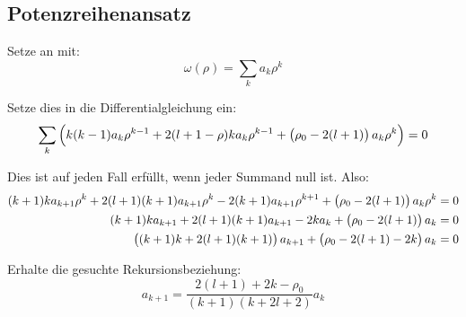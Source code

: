\subsection{Potenzreihenansatz}

Setze an mit:
\[
	\omega(\rho) = \sum_k a_k \rho^k
\]

Setze dies in die Differentialgleichung ein:
\[
	\sum_k \del{k(k-1) a_k \rho^{k-1} + 2(l+1-\rho) k a_k \rho^{k-1} + \del{\rho_0 - 2(l+1)} a_k \rho^k} = 0
\]

Dies ist auf jeden Fall erfüllt, wenn jeder Summand null ist. Also:
\begin{align*}
	(k+1) k a_{k+1} \rho^k + 2(l+1)(k+1) a_{k+1} \rho^k
	- 2(k+1) a_{k+1} \rho^{k+1} + \del{\rho_0 - 2(l+1)} a_k \rho^k &= 0 \\
	(k+1) k a_{k+1} + 2(l+1)(k+1) a_{k+1} - 2k a_k
	+ \del{\rho_0 - 2(l+1)} a_k &= 0 \\
	\del{(k+1) k + 2(l+1)(k+1) } a_{k+1}
	+ \del{\rho_0 - 2(l+1) - 2k} a_k &= 0
\end{align*}

Erhalte die gesuchte Rekursionsbeziehung:
\[
	a_{k+1} = \frac{2(l+1) + 2k - \rho_0}{(k+1)(k+2l+2)} a_k
\]


\IfFileExists{\bibliographyfile}{
}{}



